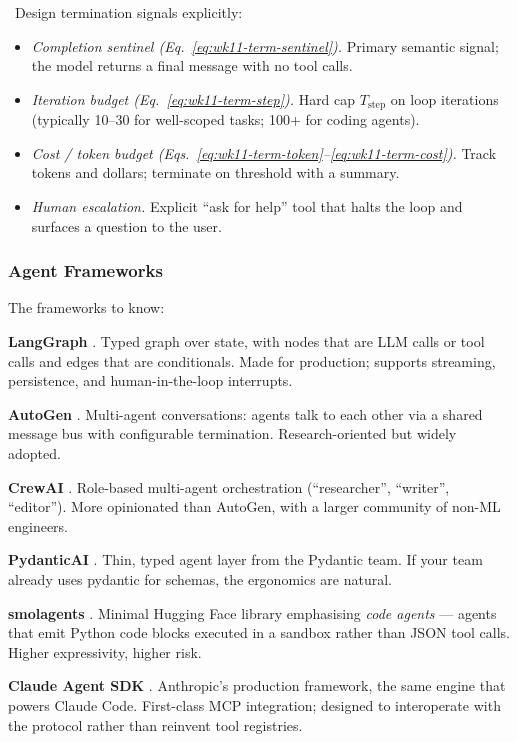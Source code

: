 \Cons\ Design termination signals explicitly:
\begin{itemize}
  \item \emph{Completion sentinel (Eq.~\eqref{eq:wk11-term-sentinel}).}
        Primary semantic signal; the model returns a final message
        with no tool calls.
  \item \emph{Iteration budget (Eq.~\eqref{eq:wk11-term-step}).}
        Hard cap $T_\mathrm{step}$ on loop iterations (typically
        10--30 for well-scoped tasks; 100+ for coding agents).
  \item \emph{Cost / token budget
        (Eqs.~\eqref{eq:wk11-term-token}--\eqref{eq:wk11-term-cost}).}
        Track tokens and dollars; terminate on threshold with a
        summary.
  \item \emph{Human escalation.} Explicit ``ask for help'' tool
        that halts the loop and surfaces a question to the user.
\end{itemize}

\subsubsection{Agent Frameworks}

The frameworks to know:

\textbf{LangGraph} \citep{langgraph_docs}. Typed graph over
state, with nodes that are LLM calls or tool calls and edges
that are conditionals. Made for production; supports streaming,
persistence, and human-in-the-loop interrupts.

\textbf{AutoGen} \citep{wu2023autogen}. Multi-agent
conversations: agents talk to each other via a shared message
bus with configurable termination. Research-oriented but widely
adopted.

\textbf{CrewAI} \citep{crewai_docs}. Role-based multi-agent
orchestration (``researcher'', ``writer'', ``editor''). More
opinionated than AutoGen, with a larger community of non-ML
engineers.

\textbf{PydanticAI} \citep{pydantic_ai_docs}. Thin, typed agent
layer from the Pydantic team. If your team already uses pydantic
for schemas, the ergonomics are natural.

\textbf{smolagents} \citep{smolagents_docs}. Minimal Hugging Face
library emphasising \emph{code agents} --- agents that emit
Python code blocks executed in a sandbox rather than JSON tool
calls. Higher expressivity, higher risk.

\textbf{Claude Agent SDK} \citep{anthropic_agent_sdk}. Anthropic's
production framework, the same engine that powers Claude Code.
First-class MCP integration; designed to interoperate with the
protocol rather than reinvent tool registries.

